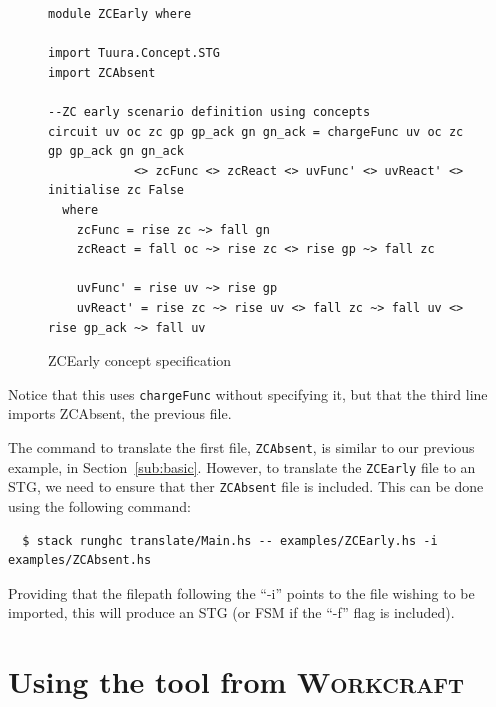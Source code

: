 \documentclass[british,technote,compsoc]{IEEEtran}
\newcommand{\noun}[1]{\textsc{#1}}
\begin{document}
\begin{figure}[H]
\begin{centering}

\begin{verbatim}
module ZCEarly where

import Tuura.Concept.STG
import ZCAbsent

--ZC early scenario definition using concepts
circuit uv oc zc gp gp_ack gn gn_ack = chargeFunc uv oc zc gp gp_ack gn gn_ack
            <> zcFunc <> zcReact <> uvFunc' <> uvReact' <> initialise zc False
  where
    zcFunc = rise zc ~> fall gn
    zcReact = fall oc ~> rise zc <> rise gp ~> fall zc

    uvFunc' = rise uv ~> rise gp
    uvReact' = rise zc ~> rise uv <> fall zc ~> fall uv <> rise gp_ack ~> fall uv

\end{verbatim}

\par\end{centering}

\begin{centering}
\protect\caption{\label{fig:concepts_file}ZCEarly concept specification}

\par\end{centering}

\end{figure}

Notice that this uses \texttt{chargeFunc} without specifying it, but that the third line imports ZCAbsent, the previous file.

The command to translate the first file, \texttt{ZCAbsent}, is similar to our previous example, in Section~\ref{sub:basic}.
However, to translate the \texttt{ZCEarly} file to an STG, we need to ensure that ther \texttt{ZCAbsent} file is included. This can be done using the following command:

\begin{verbatim}
  $ stack runghc translate/Main.hs -- examples/ZCEarly.hs -i examples/ZCAbsent.hs
\end{verbatim}

Providing that the filepath following the ``-i'' points to the file wishing to be imported, this will produce an STG (or FSM if the ``-f'' flag is included).

\section{Using the tool from \noun{Workcraft} \label{sec:workcraft_usage}}
\end{document}

